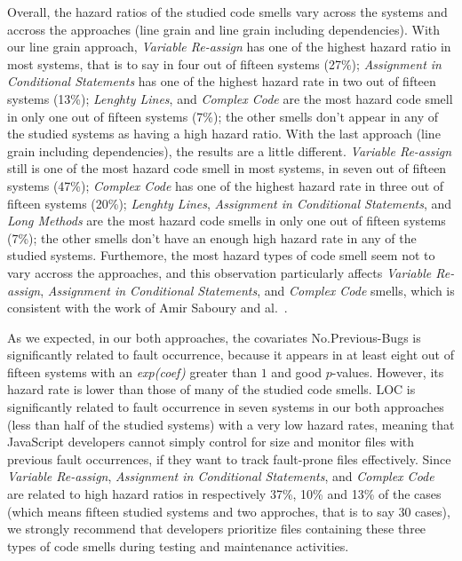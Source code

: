 Overall, the hazard ratios of the studied code smells vary across the systems {\color{blue} and accross the approaches (line grain and line grain including dependencies). With our line grain approach, \textsl{Variable Re-assign} has one of the highest hazard ratio in most systems, that is to say in four out of fifteen systems (27\%); \textsl{Assignment in Conditional Statements}  has one of the highest hazard rate in two out of fifteen systems (13\%); \textsl{Lenghty Lines}, and \textsl{Complex Code} are the most hazard code smell in only one out of fifteen systems (7\%); the other smells don't appear in any of the studied systems as having a high hazard ratio. With the last approach (line grain including dependencies), the results are a little different. \textsl{Variable Re-assign} still is one of the most hazard code smell in most systems, in seven out of fifteen systems (47\%); \textsl{Complex Code}  has one of the highest hazard rate in three out of fifteen systems (20\%); \textsl{Lenghty Lines}, \textsl{Assignment in Conditional Statements}, and \textsl{Long Methods} are the most hazard code smells in only one out of fifteen systems (7\%); the other smells don't have an enough high hazard rate in any of the studied systems. Furthemore, the most hazard types of code smell seem not to vary accross the approaches, and this observation particularly affects \textsl{Variable Re-assign}, \textsl{Assignment in Conditional Statements}, and \textsl{Complex Code} smells, which is consistent with the work of Amir Saboury and al.~\cite{saboury2017empirical}.}

As we expected, {\color{blue}in our both approaches,} the covariates No.Previous-Bugs is significantly related to fault occurrence, {\color{blue}because it appears in at least eight out of fifteen systems with an \textsl{exp(coef)} greater than $1$ and good $p$-values. However, its hazard rate is lower than those of many of the studied code smells. LOC is significantly related to fault occurrence in seven systems in our both approaches (less than half of the studied systems) with a very low hazard rates,} meaning that JavaScript developers cannot simply control for size and monitor files with previous fault occurrences, if they want to track fault-prone files effectively. Since \textsl{Variable Re-assign}, {\color{blue}\textsl{Assignment in Conditional Statements}, and \textsl{Complex Code} are related to high hazard ratios in respectively 37\%, 10\% and 13\% of the cases (which means fifteen studied systems and two approches, that is to say $30$ cases),} we strongly recommend that developers prioritize files containing these three types of code smells during testing and maintenance activities.


